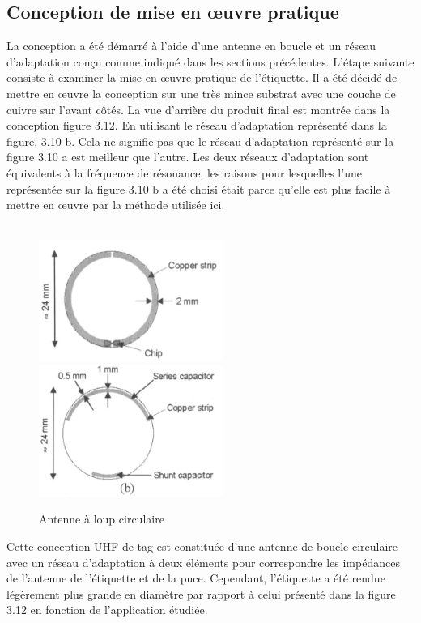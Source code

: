 \documentclass[11pt, a4paper, twoside]{book}
\begin{document}
\subsection{Conception de mise en œuvre pratique}
La conception a été démarré à l'aide d'une antenne en boucle et un réseau d'adaptation conçu comme indiqué dans les sections précédentes. L'étape suivante consiste à examiner la mise en œuvre pratique de l'étiquette. Il a été décidé de mettre en œuvre la conception sur une très mince substrat avec une couche de cuivre sur l'avant côtés. La vue d'arrière du produit final est montrée dans la conception figure 3.12. En utilisant le réseau d'adaptation représenté dans la figure. 3.10 b. Cela ne signifie pas que le réseau d'adaptation représenté sur la figure 3.10 a est meilleur que l'autre. Les deux réseaux d'adaptation sont équivalents à la fréquence de résonance, les raisons pour lesquelles l'une représentée sur la figure 3.10 b a été choisi était parce qu'elle est plus facile à mettre en œuvre par la méthode utilisée ici.\\\\
\begin{figure}[H]
\centering
\includegraphics[width=6cm]{front}
\includegraphics[width=6cm]{back}
\caption{Antenne à loup circulaire}
\end{figure}

Cette conception UHF de tag est constituée d'une antenne de boucle circulaire avec un réseau d'adaptation à deux éléments pour correspondre les impédances de l'antenne de l'étiquette et de la puce. Cependant, l'étiquette a été rendue légèrement plus grande en diamètre par rapport à celui présenté dans la figure 3.12 en fonction de l'application étudiée. 
\end{document}
